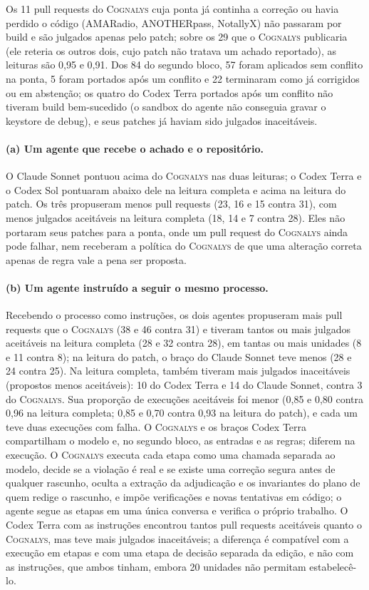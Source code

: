 \documentclass[conference]{IEEEtran}
\newcommand{\system}{\textsc{Cognalys}}
\begin{document}
Os 11 pull requests do \system{} cuja ponta já continha a correção ou havia perdido
o código (AMARadio, ANOTHERpass, NotallyX) não passaram por build e são julgados
apenas pelo patch;
sobre os 29 que o \system{} publicaria (ele reteria os outros dois, cujo patch não
tratava um achado reportado), as leituras são 0,95 e 0,91. Dos 84
do segundo bloco, 57 foram aplicados sem conflito na ponta, 5 foram portados após um
conflito e 22 terminaram como já corrigidos ou em abstenção; os quatro do Codex Terra portados
após um conflito não tiveram build bem-sucedido (o sandbox do agente não conseguia gravar o keystore
de debug), e seus patches já haviam sido julgados inaceitáveis.

\paragraph{(a) Um agente que recebe o achado e o repositório.} O Claude Sonnet
pontuou acima do \system{} nas duas leituras; o Codex Terra e o Codex Sol pontuaram
abaixo dele na leitura completa e acima na leitura do patch. Os
três propuseram menos pull requests (23, 16 e 15 contra 31), com menos
julgados aceitáveis na leitura completa (18, 14 e 7 contra 28). Eles não portaram
seus patches para a ponta, onde um pull request do \system{} ainda pode falhar, nem
receberam a política do \system{} de que uma alteração correta apenas de regra vale a pena ser proposta.

\paragraph{(b) Um agente instruído a seguir o mesmo processo.}
Recebendo o processo como instruções, os dois agentes propuseram mais pull requests
que o \system{} (38 e 46 contra 31) e tiveram tantos ou mais julgados aceitáveis
na leitura completa (28 e 32 contra 28), em tantas ou mais unidades (8 e 11
contra 8); na leitura do patch, o braço do Claude Sonnet teve menos (28 e 24
contra 25). Na leitura completa, também tiveram mais julgados inaceitáveis
(propostos menos aceitáveis): 10 do Codex Terra e 14 do Claude Sonnet, contra 3
do \system{}. Sua proporção de execuções aceitáveis foi menor (0,85 e 0,80 contra
0,96 na leitura completa; 0,85 e 0,70 contra 0,93 na leitura do
patch), e cada um teve duas execuções com falha.
O \system{} e os braços Codex Terra compartilham o modelo e, no segundo bloco,
as entradas e as regras; diferem na execução. O \system{} executa cada etapa como uma
chamada separada ao modelo, decide se a violação é real e se existe uma correção segura
antes de qualquer rascunho, oculta a extração da adjudicação e os invariantes do plano
de quem redige o rascunho, e impõe verificações e novas tentativas em código; o agente
segue as etapas em uma única conversa e verifica o próprio trabalho.
O Codex Terra com as instruções encontrou tantos pull requests aceitáveis quanto o
\system{}, mas teve mais julgados inaceitáveis; a diferença é compatível com a
execução em etapas e com uma etapa de decisão separada da edição, e não com as
instruções, que ambos tinham, embora 20 unidades não permitam estabelecê-lo.
\end{document}
